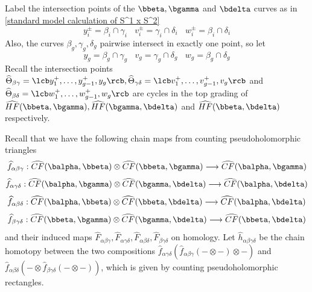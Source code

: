 Label the intersection points of the $\bbeta,\bgamma$ and $\bdelta$ curves as in \cref{standard model calculation of S^1 x S^2}
\[ y_i^\pm = \beta_i \cap \gamma_i \ \ \ \ v_i^\pm = \gamma_i \cap \delta_i \ \ \ \ w_i^\pm = \beta_i \cap \delta_i \]
Also, the curves $\beta_g,\gamma_g,\delta_g$ pairwise intersect in exactly one point, so let
\[ y_g = \beta_g \cap \gamma_g \ \ \ \ v_g = \gamma_g \cap \delta_g \ \ \ \ w_g = \beta_g \cap \delta_g \]
Recall the intersection points $\widehat{\Theta}_{\beta\gamma}=\lcb y_1^+,\ldots,y_{g-1}^+,y_g \rcb, \widehat{\Theta}_{\gamma\delta}=\lcb v_1^+,\ldots,v_{g-1}^+,v_g \rcb$ and $\widehat{\Theta}_{\beta\delta}=\lcb w_1^+,\ldots,w_{g-1}^+,w_g \rcb$ are cycles in the top grading of $\widehat{HF}(\bbeta,\bgamma),\widehat{HF}(\bgamma,\bdelta)$ and $\widehat{HF}(\bbeta,\bdelta)$ respectively. 

Recall that we have the following chain maps from counting pseudoholomorphic triangles
\[ \widehat{f}_{\alpha\beta\gamma}  : \widehat{CF}(\balpha,\bbeta)  \otimes \widehat{CF}(\bbeta,\bgamma)  \longrightarrow \widehat{CF}(\balpha,\bgamma) \]
\[ \widehat{f}_{\alpha\gamma\delta} : \widehat{CF}(\balpha,\bgamma) \otimes \widehat{CF}(\bgamma,\bdelta) \longrightarrow \widehat{CF}(\balpha,\bdelta) \]
\[ \widehat{f}_{\alpha\beta\delta}  : \widehat{CF}(\balpha,\bbeta)  \otimes \widehat{CF}(\bbeta,\bdelta)  \longrightarrow \widehat{CF}(\balpha,\bdelta) \]
\[ \widehat{f}_{\beta\gamma\delta}  : \widehat{CF}(\bbeta,\bgamma)  \otimes \widehat{CF}(\bgamma,\bdelta)  \longrightarrow \widehat{CF}(\bbeta,\bdelta) \]
and their induced maps $\widehat{F}_{\alpha\beta\gamma},\widehat{F}_{\alpha\gamma\delta},\widehat{F}_{\alpha\beta\delta},\widehat{F}_{\beta\gamma\delta}$ on homology. Let $\widehat{h}_{\alpha\beta\gamma\delta}$ be the chain homotopy between the two compositions $\widehat{f}_{\alpha\gamma\delta}(\widehat{f}_{\alpha\beta\gamma}(- \otimes -) \otimes -)$ and $\widehat{f}_{\alpha\beta\delta}(- \otimes \widehat{f}_{\beta\gamma\delta}(- \otimes -))$, which is given by counting pseudoholomorphic rectangles.

